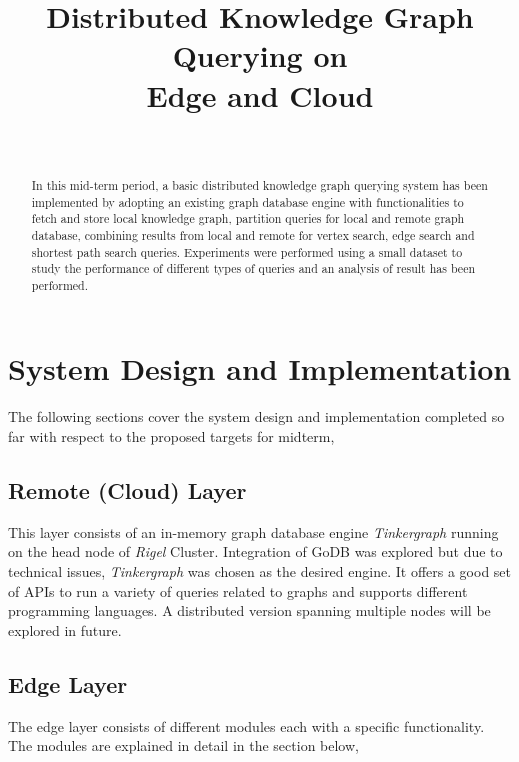 \documentclass[conference]{IEEEtran}
\begin{document}
\title{Distributed Knowledge Graph Querying on \\ Edge and Cloud}


\author{\\
}


\maketitle


\begin{abstract}
In this mid-term period, a basic distributed knowledge graph querying system has been implemented by adopting an existing graph database engine with functionalities to fetch and store local knowledge graph, partition queries for local and remote graph database, combining results from local and remote for vertex search, edge search and shortest path search queries. Experiments were performed using a small dataset to study the performance of different types of queries and an analysis of result has been performed.  
\end{abstract}

\section{System Design and Implementation}

The following sections cover the system design and implementation completed so far with respect to the proposed targets for midterm,

\subsection{Remote (Cloud) Layer}
This layer consists of an in-memory graph database engine \emph{Tinkergraph} running on the head node of \emph{Rigel} Cluster. Integration of GoDB was explored but due to technical issues, \emph{Tinkergraph} was chosen as the desired engine. It offers a good set of APIs to run a variety of queries related to graphs and supports different programming languages. A distributed version spanning multiple nodes will be explored in future.

\subsection{Edge Layer}
The edge layer consists of different modules each with a specific functionality. The modules are explained in detail in the section below,
\end{document}

